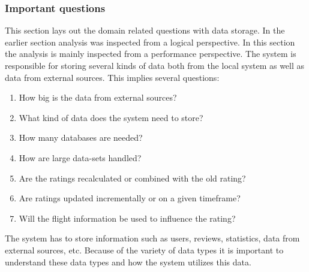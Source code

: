 \subsubsection{Important questions}
This section lays out the domain related questions with data storage. In the earlier section analysis was inspected from a logical perspective. In this section the analysis is mainly inspected from a performance perspective.
The system is responsible for storing several kinds of data both from the local system as well as data from external sources. This implies several questions:
\begin{enumerate}
\item How big is the data from external sources?
\item What kind of data does the system need to store?
\item How many databases are needed?
\item How are large data-sets handled?
\item Are the ratings recalculated or combined with the old rating?
\item Are ratings updated incrementally or on a given timeframe?
\item Will the flight information be used to influence the rating?
\end{enumerate}
The system has to store information such as users, reviews, statistics, data from external sources, etc. Because of the variety of data types it is important to understand these data types and how the system utilizes this data.

